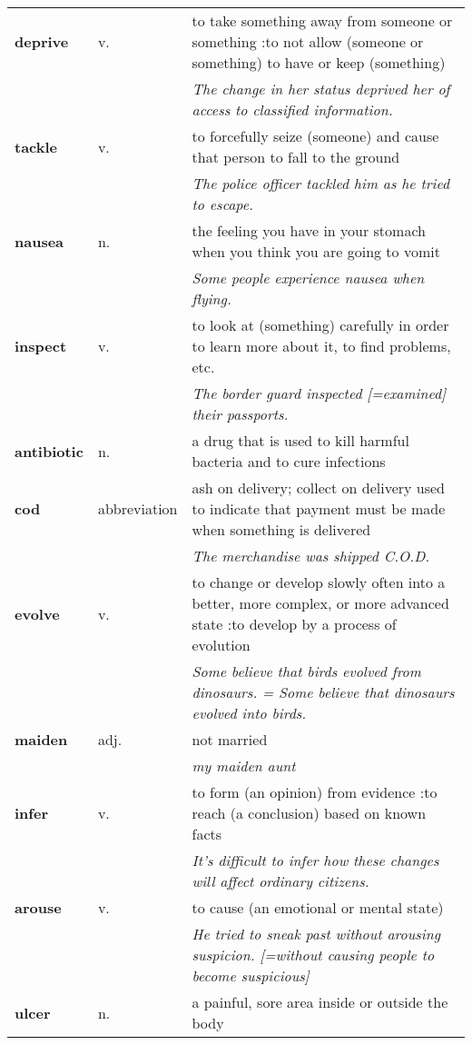 \documentclass[a4paper]{article}
\begin{document}
\begin{longtable}{llp{11cm}}
\textbf{deprive} & v. &  to take something away from someone or something :to not allow (someone or something) to have or keep (something) \\
 & & \textit{The change in her status deprived her of access to classified information.}\\[0.08cm]
\textbf{tackle} & v. &  to forcefully seize (someone) and cause that person to fall to the ground \\
 & & \textit{The police officer tackled him as he tried to escape.}\\[0.08cm]
\textbf{nausea} & n. &  the feeling you have in your stomach when you think you are going to vomit \\
 & & \textit{Some people experience nausea when flying.}\\[0.08cm]
\textbf{inspect} & v. &  to look at (something) carefully in order to learn more about it, to find problems, etc. \\
 & & \textit{The border guard inspected [=examined] their passports.}\\[0.08cm]
\textbf{antibiotic} & n. &  a drug that is used to kill harmful bacteria and to cure infections\\[0.08cm]
\textbf{cod} & abbreviation &  ash on delivery; collect on delivery used to indicate that payment must be made when something is delivered \\
 & & \textit{The merchandise was shipped C.O.D.}\\[0.08cm]
\textbf{evolve} & v. &  to change or develop slowly often into a better, more complex, or more advanced state :to develop by a process of evolution \\
 & & \textit{Some believe that birds evolved from dinosaurs. = Some believe that dinosaurs evolved into birds.}\\[0.08cm]
\textbf{maiden} & adj. &  not married \\
 & & \textit{my maiden aunt}\\[0.08cm]
\textbf{infer} & v. &  to form (an opinion) from evidence :to reach (a conclusion) based on known facts \\
 & & \textit{It's difficult to infer how these changes will affect ordinary citizens.}\\[0.08cm]
\textbf{arouse} & v. &  to cause (an emotional or mental state) \\
 & & \textit{He tried to sneak past without arousing suspicion. [=without causing people to become suspicious]}\\[0.08cm]
\textbf{ulcer} & n. &  a painful, sore area inside or outside the body \\

\end{longtable}
\end{document}
